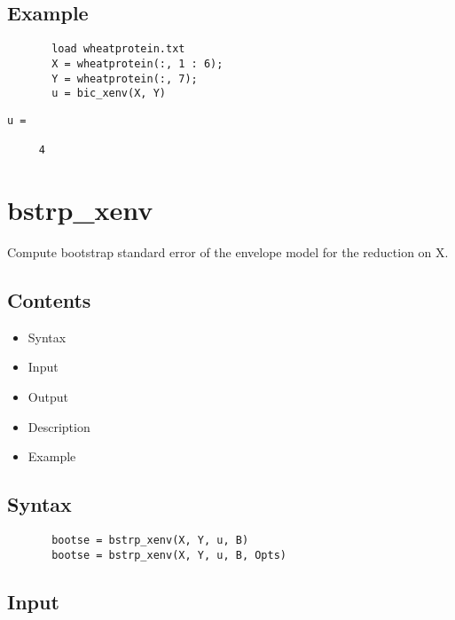 \documentclass[a4paper,11pt,openany]{memoir}
\begin{document}
\subsection*{Example}


\begin{verbatim}       load wheatprotein.txt
       X = wheatprotein(:, 1 : 6);
       Y = wheatprotein(:, 7);
       u = bic_xenv(X, Y)\end{verbatim}
    
        \color{lightgray}\ttfamily \begin{verbatim}
u =

     4

\end{verbatim} \rmfamily
\color{black}

\newpage

\rmfamily
\color{black}\section{bstrp\_xenv}

\begin{par}
Compute bootstrap standard error of the envelope model for the reduction on X.
\end{par} \vspace{1em}

\subsection*{Contents}

\begin{itemize}
\setlength{\itemsep}{-1ex}
   \item Syntax
   \item Input
   \item Output
   \item Description
   \item Example
\end{itemize}


\subsection*{Syntax}


\begin{verbatim}       bootse = bstrp_xenv(X, Y, u, B)
       bootse = bstrp_xenv(X, Y, u, B, Opts)\end{verbatim}
    

\subsection*{Input}
\end{document}
